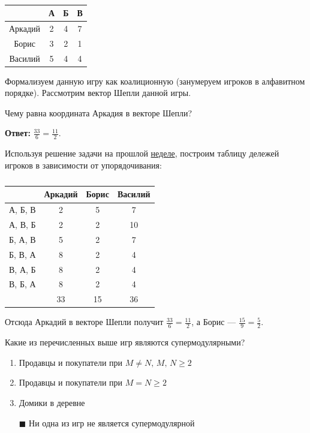 	\begin{table}[h]
		\label{sheply:table1}
		\caption{}
		\centering
		\begin{tabular}{|c|c|c|c|}
			\hline & А & Б & В \\ 	
			\hline Аркадий & 2 & 4 & 7 \\ 
			\hline Борис & 3 & 2 & 1 \\ 
			\hline Василий & 5 & 4 & 4 \\ 
			\hline 
		\end{tabular} 
	\end{table}

	Формализуем данную игру как коалиционную (занумеруем игроков в алфавитном порядке). Рассмотрим вектор Шепли данной игры.
	
	Чему равна координата Аркадия в векторе Шепли?
	
	\textbf{Ответ:} $\frac{33}{6} = \frac{11}{2}$.
	
	\solution
	Используя решение задачи на прошлой \hyperref[arkadiy:sol1]{неделе}, построим таблицу дележей игроков в зависимости от упорядочивания:
	\begin{table}[h]
		\label{sheply:table2}
		\caption{}
		\centering
	\begin{tabular}{|c|c|c|c|}
		\hline 
		& Аркадий & Борис & Василий \\ 
		\hline 
		А, Б, В & 2 & 5 & 7 \\ 
		\hline 
		А, В, Б & 2 & 2 & 10 \\ 
		\hline 
		Б, А, В & 5 & 2 & 7 \\ 
		\hline 
		Б, В, А & 8 & 2 & 4 \\ 
		\hline 
		В, А, Б & 8 & 2 & 4 \\ 
		\hline 
		В, Б, А & 8 & 2 & 4 \\ 
		\hline 
		& 33 & 15 & 36 \\ 
		\hline 
	\end{tabular}
	\end{table}

	Отсюда Аркадий в векторе Шепли получит $\frac{33}{6} = \frac{11}{2}$, а Борис --- $\frac{15}{9}=\frac{5}{2}$.
	
	\task
	Какие из перечисленных выше игр являются супермодулярными?
	
	\begin{enumerate}[label=$\square$]
		\item Продавцы и покупатели при $M \neq N,\, M,\, N \geq 2$
		\item Продавцы и покупатели при $M = N \geq 2$
		\item Домики в деревне
		\item[$\blacksquare$] Ни одна из игр не является супермодулярной
	\end{enumerate}

